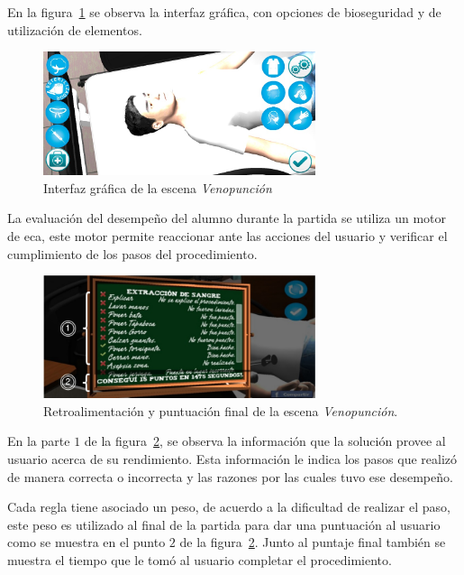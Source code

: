 En la figura~\ref{fig:hemocultivo_gui} se observa la interfaz gráfica, con
opciones de bioseguridad y de utilización de elementos.

\begin{figure}
\centering
\includegraphics[width=8cm]{../solucion/images/hemocultivo_gui.jpg}
\caption{Interfaz gráfica de la escena \emph{Venopunción}}
\label{fig:hemocultivo_gui}
\end{figure}

La evaluación del desempeño del alumno durante la partida se utiliza un
motor de \gls{eca}\cite{bailey2004event,behrends2006combining}, este motor
permite reaccionar ante las acciones del usuario y verificar el cumplimiento de
los pasos del procedimiento. 

\begin{figure}
\centering 
\includegraphics[width=8cm]{../solucion/images/hemocultivo_retroalimentacion.jpg}
\caption{Retroalimentación y puntuación final de la escena \emph{Venopunción}.}
\label{fig:hemocultivo_retroalimentacion}
\end{figure}

En la parte $1$ de la figura~\ref{fig:hemocultivo_retroalimentacion}, se observa
la información que la solución provee al usuario acerca de su rendimiento. Esta
información le indica los pasos que realizó de manera correcta o incorrecta y
las razones por las cuales tuvo ese desempeño.

Cada regla tiene asociado un peso, de acuerdo a la dificultad de realizar el
paso, este peso es utilizado al final de la partida para dar una puntuación al
usuario como se muestra en el punto $2$ de la
figura~\ref{fig:hemocultivo_retroalimentacion}. Junto al puntaje final también
se muestra el tiempo que le tomó al usuario completar el procedimiento.

